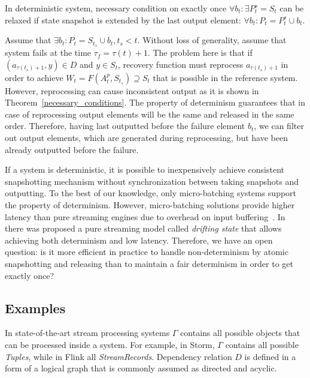 \begin{theorem}
\label{determinism}
In deterministic system, necessary condition on exactly once $\forall{b_t} : \exists{P^{s}_t=S_t}$ can be relaxed if state snapshot is extended by the last output element: $\forall{b_t}:P_t=P^{s}_t \cup b_t$.
\end{theorem}
\begin{sketch}
Assume that $\exists{b_t}:P_t = S_{t_s} \cup b_t, t_s < t$. Without loss of generality, assume that system fails at the time $\tau_f = \tau(t)+1$. The problem here is that if $(a_{\tau(t_s)+1},y)\in{D}$ and $y\in{S_t}$, recovery function must reprocess $a_{\tau(t_s)+1}$ in order to achieve $W_t=F(A^{p}_t,S_{t_s})\supseteq{S_t}$ that is possible in the reference system. However, reprocessing can cause inconsistent output as it is shown in Theorem~\ref{necessary_conditions}. The property of determinism guarantees that in case of reprocessing output elements will be the same and released in the same order. Therefore, having last outputted before the failure element $b_t$, we can filter out output elements, which are generated during reprocessing, but have been already outputted before the failure.
\end{sketch}

If a system is deterministic, it is possible to inexpensively achieve consistent snapshotting mechanism without synchronization between taking snapshots and outputting. To the best of our knowledge, only micro-batching systems support the property of determinism. However, micro-batching solutions provide higher latency than pure streaming engines due to overhead on input buffering~\cite{karimov2018benchmarking}. In~\cite{we2018adbis} there was proposed a pure streaming model called {\em drifting state} that allows achieving both determinism and low latency. Therefore, we have an open question: is it more efficient in practice to handle non-determinism by atomic snapshotting and releasing than to maintain a fair determinism in order to get exactly once?  

\subsection{Examples}

In state-of-the-art stream processing systems $\Gamma$ contains all possible objects that can be processed inside a system. For example, in Storm, $\Gamma$ contains all possible {\em Tuples}, while in Flink all {\em StreamRecords}. Dependency relation $D$ is defined in a form of a logical graph that is commonly assumed as directed and acyclic.

